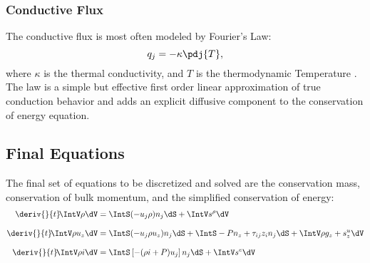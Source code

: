 \subsubsection{Conductive Flux}

The conductive flux is most often modeled by Fourier's Law:
\begin{equation}
    q_j = - \kappa \pdj{T},
\end{equation}
where $\kappa$ is the thermal conductivity, and $T$ is the thermodynamic Temperature \cite{incropera_introduction_2006}.
The law is a simple but effective first order linear approximation of true conduction behavior and adds an explicit diffusive component to the conservation of energy equation.

\subsection{Final Equations}

The final set of equations to be discretized and solved are the conservation mass, conservation of bulk momentum, and the simplified conservation of energy:
\begin{subequations}
    \label{Eqn:TheFinalEquations}
    \begin{align}
        \deriv{}{t}\!\IntV \rho \dV      &= \IntS (-u_j \rho)n_j\dS + \IntV s^\rho\dV \\[0.8em]
        \deriv{}{t}\! \IntV \rho u_z \dV &= \IntS (-u_j \rho u_z) n_j \dS + \IntS - P n_z + \tau_{ij} z_i n_j \dS + \IntV \rho g_z + s^u_z \dV \\[0.8em]
        \deriv{}{t}\! \IntV \rho i \dV   &= \IntS \left[- (\rho{i} + P) u_j\right] n_j\dS + \IntV s^e \dV
    \end{align}
\end{subequations}












